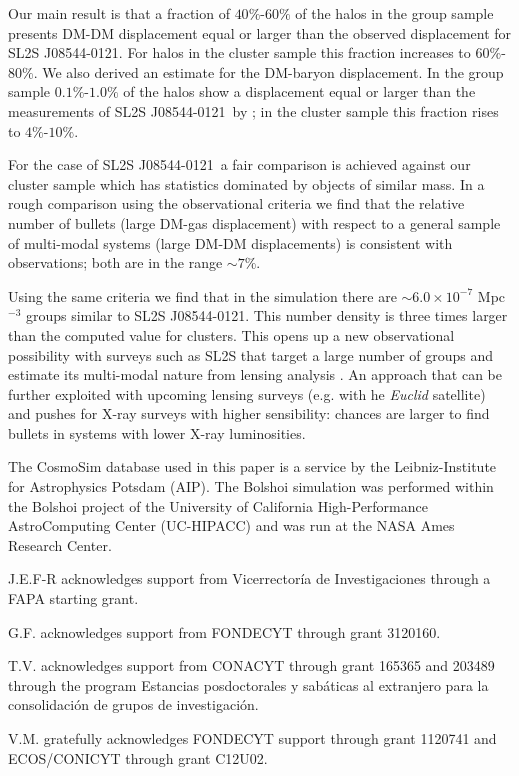 \documentclass{emulateapj}
\newcommand{\bullg}{SL2S J08544-0121}
\begin{document}
Our main result is that a fraction of $40\%$-$60\%$ of the halos
in the group sample presents DM-DM displacement equal or larger than the
observed displacement for \bullg. For halos in the cluster sample this
fraction increases to $60\%$-$80\%$. We also derived an
estimate for the DM-baryon displacement. In the group sample
$0.1\%$-$1.0\%$ of the halos show a displacement equal or larger than
the  measurements of \bullg\ by \citep{Gastaldello}; in the cluster
sample this fraction rises to $4\%$-$10\%$. 

For the case of \bullg\ a fair comparison is achieved against our cluster
sample which has statistics dominated by objects of similar mass. In
a rough comparison using the observational criteria \citep{Foex2013,
  Gastaldello} we find that the relative number of bullets
(large DM-gas displacement) with respect to a general sample of
multi-modal systems (large DM-DM displacements) is consistent with
observations; both are in the range $\sim 7\%$. 

Using the same criteria we find that in the simulation there are
$\sim 6.0\times 10^{-7}$ Mpc$^{-3}$ groups similar to \bullg. This
number density is three times larger than the computed value for
clusters. This opens up a new observational possibility with surveys
such as SL2S that target a large number of groups and estimate its
multi-modal nature from lensing analysis \citep{Foex2013}. An approach
that can be further exploited with upcoming lensing surveys (e.g. with
 he {\it Euclid} satellite) and pushes for X-ray surveys with higher
sensibility: chances are larger to find bullets in systems with lower
X-ray luminosities.

The CosmoSim database used in this paper is a service by the
Leibniz-Institute for Astrophysics Potsdam (AIP). The  Bolshoi
simulation was performed within the Bolshoi project of the University
of California High-Performance AstroComputing Center (UC-HIPACC) and
was run at the NASA Ames Research Center. 

J.E.F-R acknowledges support from Vicerrector\'ia de
Investigaciones through a FAPA starting grant.

G.F. acknowledges support from FONDECYT through grant 3120160.

T.V. acknowledges support from CONACYT through grant 165365 and
203489 through the program Estancias posdoctorales y sab\'aticas al
extranjero para la consolidaci\'on de grupos de investigaci\'on.  

V.M. gratefully acknowledges FONDECYT support through grant 1120741
and ECOS/CONICYT through grant C12U02. 




 
\end{document}
